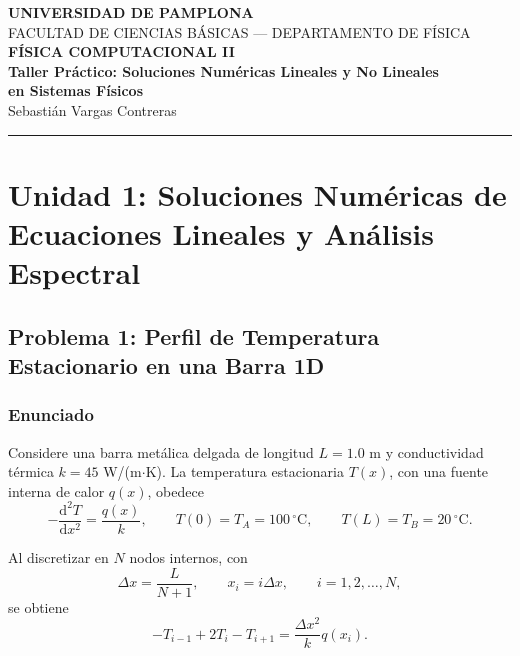 \documentclass[11pt,a4paper]{article}
\newcommand{\dd}{\mathrm{d}}
\begin{document}
\begin{center}
  {\Large\bfseries UNIVERSIDAD DE PAMPLONA}\\[4pt]
  {\large FACULTAD DE CIENCIAS BÁSICAS --- DEPARTAMENTO DE FÍSICA}\\[9pt]
  {\LARGE\bfseries FÍSICA COMPUTACIONAL II}\\[8pt]
  {\Large\bfseries Taller Práctico: Soluciones Numéricas Lineales y No Lineales\\
  en Sistemas Físicos}\\[10pt]
  {\large Sebastián Vargas Contreras}
\end{center}

\vspace{3pt}
\noindent\rule{\textwidth}{0.6pt}

\tableofcontents
\newpage

\section{Unidad 1: Soluciones Numéricas de Ecuaciones Lineales y Análisis Espectral}

\subsection{Problema 1: Perfil de Temperatura Estacionario en una Barra 1D}

\subsubsection*{Enunciado}

Considere una barra metálica delgada de longitud $L=1.0$ m y conductividad térmica $k=45$ W/(m$\cdot$K). La temperatura estacionaria $T(x)$, con una fuente interna de calor $q(x)$, obedece
\begin{equation}
-
\frac{\dd^2T}{\dd x^2}=\frac{q(x)}{k},
\qquad
T(0)=T_A=100\,^{\circ}\mathrm C,
\qquad
T(L)=T_B=20\,^{\circ}\mathrm C.
\end{equation}

Al discretizar en $N$ nodos internos, con
\[
\Delta x=\frac{L}{N+1},
\qquad x_i=i\Delta x,
\qquad i=1,2,\ldots,N,
\]
se obtiene
\begin{equation}
-T_{i-1}+2T_i-T_{i+1}=\frac{\Delta x^2}{k}q(x_i).
\end{equation}
\end{document}

